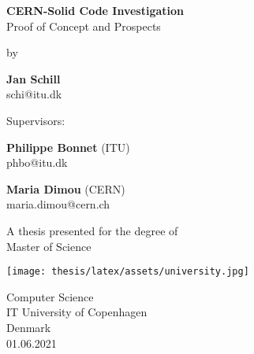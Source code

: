 \documentclass[runningheads]{thesis/latex/llncs}
\begin{document}
\begin{titlepage}
   \begin{center}
       \vspace*{1cm}
       \Huge
       \textbf{CERN-Solid Code Investigation}\\
       \LARGE
       \vspace{0.5cm}
        Proof of Concept and Prospects\\
        
       \vspace{1cm}
       
       \normalsize
        by\\
        
       \vspace{1cm}
       
       \Large
       \textbf{Jan Schill}\\
        schi@itu.dk
        
       \vfill
       
       \normalsize
        Supervisors:\\
        
       \vspace{0.3cm}
       
       \textbf{Philippe Bonnet} (ITU)\\
        phbo@itu.dk
        
       \vspace{0.3cm}
       
       \textbf{Maria Dimou} (CERN)\\
        maria.dimou@cern.ch
        
       
       \vspace{1cm}
       
        A thesis presented for the degree of\\
        Master of Science
        
       \vspace{1.5cm}
       
       \texttt{[image: thesis/latex/assets/university.jpg]}
       
       Computer Science\\
       IT University of Copenhagen\\
       Denmark\\
       01.06.2021
            
   \end{center}
\end{titlepage}


\tableofcontents
\newpage





\newpage
\printglossary[type=\acronymtype]
\newpage
\printglossary
\newpage
\printbibliography
\end{document}
